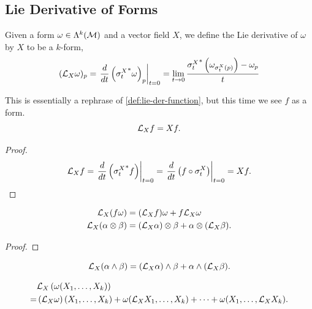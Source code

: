 \documentclass[../main.tex]{subfiles}
\begin{document}
    \subsection{Lie Derivative of Forms}
    \begin{definition}\label{def:lie-derivative-forms}
        Given a form \(\omega \in \Lambda^{k}(\mathcal{M})\) and a vector field \(X\), we define 
        the Lie derivative of \(\omega\) by \(X\) to be a \(k\)-form,
        \[
        (\mathcal{L}_{X}\omega)_p = \left.\frac{d}{dt}\left({\sigma^X_t}^*\omega\right)_p
        \right|_{t=0}
        =\lim_{t \to 0} \frac{{\sigma^X_t}^*\left(\omega_{\sigma^X_t(p)}\right)-
        \omega_p}{t}
        \]
    \end{definition}
    \begin{theorem}\label{thm:lie-derivative-functions}
        This is essentially a rephrase of \cref{def:lie-der-function}, but this time 
        we see \(f\) as a form.
        \[
        \mathcal{L}_{X}f=Xf.
        \]
    \end{theorem}
    \begin{proof}
        \[
        \mathcal{L}_{X}f=\left.\frac{d}{dt}\left({\sigma_t^X}^*f\right)\right|_{t=0}
        =\left.\frac{d}{dt}\left(f\circ \sigma_t^X\right)\right|_{t=0}=Xf.
        \]
    \end{proof}
    \begin{theorem}\label{thm:lie-der-form-product-rule}
        \[
        \begin{aligned}
            \mathcal{L}_{X}(f\omega)&=(\mathcal{L}_{X}f)\omega+f\mathcal{L}_{X}\omega \\
            \mathcal{L}_{X}(\alpha \otimes \beta) &= (\mathcal{L}_{X}\alpha)\otimes \beta +
            \alpha\otimes(\mathcal{L}_{X}\beta).
        \end{aligned}
        \]
    \end{theorem}
    \begin{proof}
        
    \end{proof}
    \begin{corollary}
        \[
        \mathcal{L}_{X}(\alpha \wedge \beta) = (\mathcal{L}_{X}\alpha)\wedge \beta +
        \alpha\wedge(\mathcal{L}_{X}\beta).
        \]
    \end{corollary}
    \begin{theorem}\label{thm:decompose-lie-der-forms}
        \[
        \begin{aligned}
            &\mathcal{L}_{X}\left(\omega(X_1, \dots, X_k)\right)\\
            =&\left(\mathcal{L}_{X}\omega\right)(X_1, \dots, X_k) + 
            \omega(\mathcal{L}_{X}X_1, \dots, X_k) + \dots + 
            \omega(X_1, \dots, \mathcal{L}_{X}X_k).
        \end{aligned}
        \]
    \end{theorem}
\end{document}
